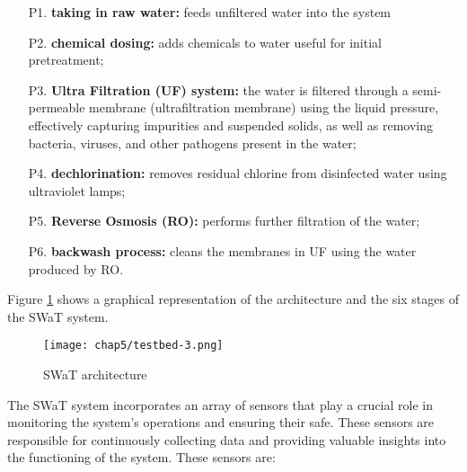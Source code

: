 \begin{enumerate}
	\item[P1.] \textbf{taking in raw water:} feeds unfiltered water into the system
	
	\item[P2.] \textbf{chemical dosing:} adds chemicals to water useful for initial pretreatment;
	
	\item[P3.] \textbf{Ultra Filtration (UF) system:} the water is filtered through a semi-permeable membrane (ultrafiltration membrane) using the liquid pressure, effectively capturing impurities and suspended solids, as well as removing bacteria, viruses, and other pathogens present in the water;
	
	\item[P4.] \textbf{dechlorination:} removes residual chlorine from disinfected water using ultraviolet lamps;
	
	\item[P5.] \textbf{Reverse Osmosis (RO):} performs further filtration of the water;
	
	\item[P6.] \textbf{backwash process:} cleans the membranes in UF using the water produced by RO.
	
\end{enumerate}

\noindent Figure \ref{fig:5_swat_architecture_1} shows a graphical representation of the architecture and the six stages of the SWaT system.

\begin{figure}[ht]
	\centering
	\texttt{[image: chap5/testbed-3.png]}
	\caption{SWaT architecture}
	\label{fig:5_swat_architecture_1}
\end{figure}

\bigskip
The SWaT system incorporates an array of sensors that play a crucial role in monitoring the system's operations and ensuring their safe. These sensors are responsible for continuously collecting data and providing valuable insights into the functioning of the system. These sensors are:

